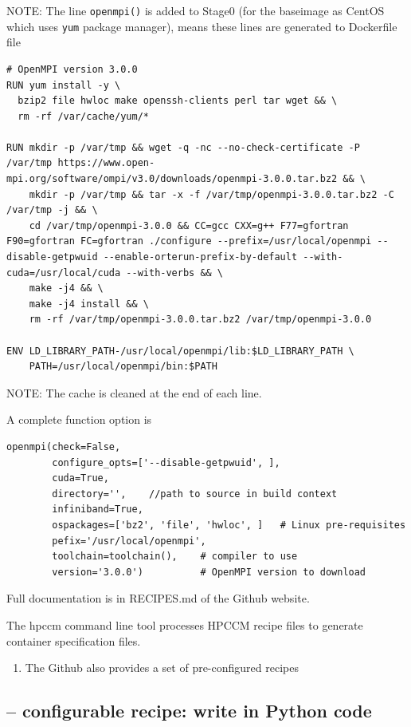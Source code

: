 \begin{mdframed}

NOTE: The line \verb!openmpi()! is added to Stage0 (for the baseimage as CentOS
which uses \verb!yum! package manager), means these lines are generated to
Dockerfile file

\begin{verbatim}
# OpenMPI version 3.0.0
RUN yum install -y \
  bzip2 file hwloc make openssh-clients perl tar wget && \
  rm -rf /var/cache/yum/*
  
RUN mkdir -p /var/tmp && wget -q -nc --no-check-certificate -P /var/tmp https://www.open-mpi.org/software/ompi/v3.0/downloads/openmpi-3.0.0.tar.bz2 && \
    mkdir -p /var/tmp && tar -x -f /var/tmp/openmpi-3.0.0.tar.bz2 -C /var/tmp -j && \
    cd /var/tmp/openmpi-3.0.0 && CC=gcc CXX=g++ F77=gfortran F90=gfortran FC=gfortran ./configure --prefix=/usr/local/openmpi --disable-getpwuid --enable-orterun-prefix-by-default --with-cuda=/usr/local/cuda --with-verbs && \
    make -j4 && \
    make -j4 install && \
    rm -rf /var/tmp/openmpi-3.0.0.tar.bz2 /var/tmp/openmpi-3.0.0
    
ENV LD_LIBRARY_PATH-/usr/local/openmpi/lib:$LD_LIBRARY_PATH \
    PATH=/usr/local/openmpi/bin:$PATH
\end{verbatim}

NOTE: The cache is cleaned at the end of each line.

A complete function option is
\begin{verbatim}
openmpi(check=False,
        configure_opts=['--disable-getpwuid', ],
        cuda=True,
        directory='',    //path to source in build context
        infiniband=True, 
        ospackages=['bz2', 'file', 'hwloc', ]   # Linux pre-requisites
        pefix='/usr/local/openmpi',
        toolchain=toolchain(),    # compiler to use
        version='3.0.0')          # OpenMPI version to download
\end{verbatim}

Full documentation is in RECIPES.md of the Github website.

\end{mdframed}

The hpccm command line tool processes HPCCM recipe files to generate container specification files.
\begin{enumerate}
  \item The Github also provides a set of pre-configured recipes
\end{enumerate}


\subsection{-- configurable recipe: write in Python code}

